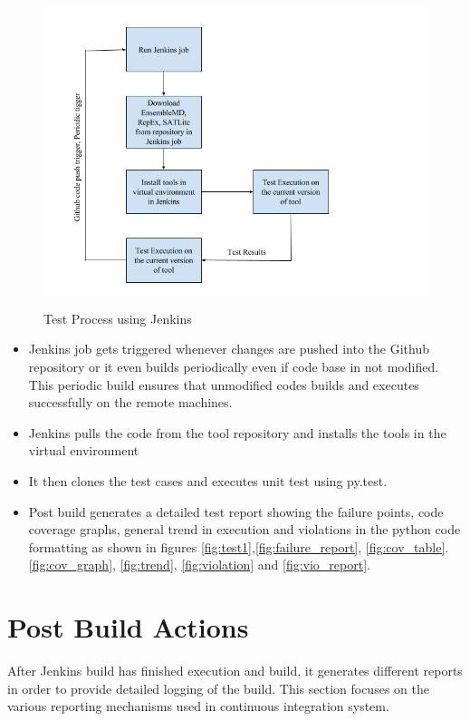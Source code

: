 \documentclass[10pt]{ruthesis}
\begin{document}
\begin{figure}
  \begin{center}
  \includegraphics[width=13cm,height=9cm]{jenkins_process.png}
  \caption{Test Process using Jenkins}
  \label{fig:jenkins_process}
  \end{center}
\end{figure}

\begin{itemize}
\item Jenkins job gets triggered whenever changes are pushed into the Github repository or it even builds periodically even if code base in not modified. This periodic build ensures that unmodified codes builds and executes successfully on the remote machines.

\item Jenkins pulls the code from the tool repository and installs the tools in the virtual environment

\item It then clones the test cases and executes unit test using py.test.

\item Post build generates a detailed test report showing the failure points, code coverage graphs, general trend in execution and violations in the python code formatting as shown in figures \ref{fig:test1},\ref{fig:failure_report}, \ref{fig:cov_table}. \ref{fig:cov_graph}, \ref{fig:trend}, \ref{fig:violation} and \ref{fig:vio_report}. 
\end{itemize}

\section{Post Build Actions}
After Jenkins build has finished execution and build, it generates different reports in order to provide detailed logging of the build. This section focuses on the various reporting mechanisms used in continuous integration system.
\end{document}
